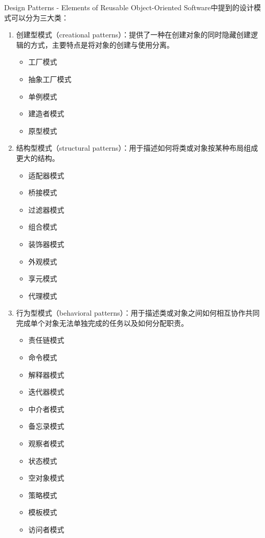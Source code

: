 Design Patterns - Elements of Reusable Object-Oriented Software中提到的设计模式可以分为三大类：

\begin{enumerate}
    \item 创建型模式（creational patterns）：提供了一种在创建对象的同时隐藏创建逻辑的方式，主要特点是将对象的创建与使用分离。
          \begin{itemize}
              \item 工厂模式
              \item 抽象工厂模式
              \item 单例模式
              \item 建造者模式
              \item 原型模式
          \end{itemize}

    \item 结构型模式（structural patterns）：用于描述如何将类或对象按某种布局组成更大的结构。
          \begin{itemize}
              \item 适配器模式
              \item 桥接模式
              \item 过滤器模式
              \item 组合模式
              \item 装饰器模式
              \item 外观模式
              \item 享元模式
              \item 代理模式
          \end{itemize}

    \item 行为型模式（behavioral patterns）：用于描述类或对象之间如何相互协作共同完成单个对象无法单独完成的任务以及如何分配职责。
          \begin{itemize}
              \item 责任链模式
              \item 命令模式
              \item 解释器模式
              \item 迭代器模式
              \item 中介者模式
              \item 备忘录模式
              \item 观察者模式
              \item 状态模式
              \item 空对象模式
              \item 策略模式
              \item 模板模式
              \item 访问者模式
          \end{itemize}


\end{enumerate}

